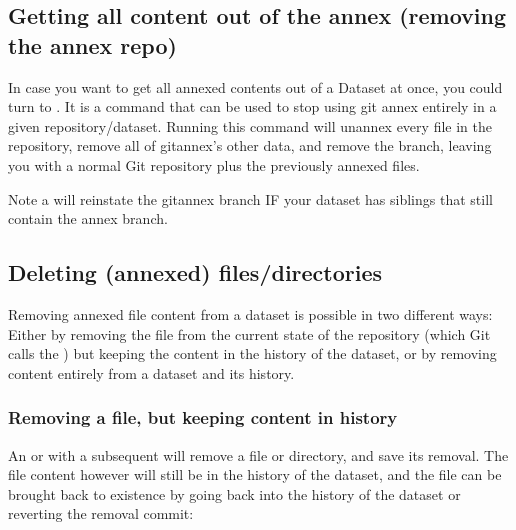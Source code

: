 \subsection{Getting all content out of the annex (removing the annex repo)}
\label{\detokenize{basics/101-136-filesystem:getting-all-content-out-of-the-annex-removing-the-annex-repo}}\label{\detokenize{basics/101-136-filesystem:uninit}}
\sphinxAtStartPar
In case you want to get all annexed contents out of a Dataset at once, you could turn to .
It is a command that can be used to stop using git annex entirely in a given repository/dataset.
Running this command will unannex every file in the repository, remove all of git\sphinxhyphen{}annex’s other data, and remove the {\hyperref[\detokenize{glossary:term-git-annex}]{}} branch, leaving you with a normal Git repository plus the previously annexed files.

\sphinxAtStartPar
Note a  will reinstate the git\sphinxhyphen{}annex branch IF your dataset has siblings that still contain the annex branch.


\subsection{Deleting (annexed) files/directories}
\label{\detokenize{basics/101-136-filesystem:deleting-annexed-files-directories}}
\sphinxAtStartPar
Removing annexed file content from a dataset is possible in two different ways:
Either by removing the file from the current state of the repository
(which Git calls the ) but keeping the content in the history
of the dataset, or by removing content entirely from a dataset and its
history.


\subsubsection{Removing a file, but keeping content in history}
\label{\detokenize{basics/101-136-filesystem:removing-a-file-but-keeping-content-in-history}}
\sphinxAtStartPar
An  or  with a subsequent 
will remove a file or directory, and save its removal. The file content however will
still be in the history of the dataset, and the file can be brought back to existence
by going back into the history of the dataset or reverting the removal commit:

